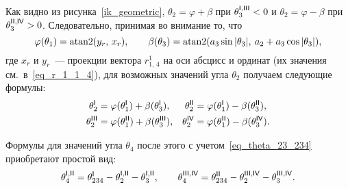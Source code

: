 Как видно из рисунка~\ref{ik_geometric}, $\theta_2 = \varphi + \beta$ при $\theta_3^{\mathsf{I,III}} < 0$ и $\theta_2 = \varphi - \beta$ при $\theta_3^{\mathsf{II,IV}} > 0$.
Следовательно, принимая во внимание то, что
\begin{equation}
    \varphi(\theta_1) = \atan2(y_r,\, x_r),
    \qquad
    \beta(\theta_3) = \atan2(a_3\sin|\theta_3|,\: a_2 + a_3\cos|\theta_3|),
\end{equation}
где $x_r$ и $y_r$~--- проекции вектора $r^1_{1,\,4}$ на оси абсцисс и ординат (их значения см.~в~\eqref{eq_r_1_1_4}), для возможных значений угла $\theta_2$ получаем следующие формулы:
\begin{align}
	\theta_2^{\mathsf{I}} &= \varphi(\theta_1^{\mathsf{I}}) + \beta(\theta_3^{\mathsf{I}}), &
	\theta_2^{\mathsf{II}} &= \varphi(\theta_1^{\mathsf{I}}) - \beta(\theta_3^{\mathsf{II}}),\\
	\theta_2^{\mathsf{III}} &= \varphi(\theta_1^{\mathsf{II}}) + \beta(\theta_3^{\mathsf{III}}), &
	\theta_2^{\mathsf{IV}} &= \varphi(\theta_1^{\mathsf{II}}) - \beta(\theta_3^{\mathsf{IV}})\ldotp
\end{align}

Формулы для значений угла $\theta_4$ после этого с учетом~\eqref{eq_theta_23_234} приобретают простой вид:
\begin{equation}
	\theta_4^{\mathsf{I,II}} = \theta_{234}^{\mathsf{I}} - \theta_{2}^{\mathsf{I,II}} - \theta_{3}^{\mathsf{I,II}},
	\qquad
	\theta_4^{\mathsf{III,IV}} = \theta_{234}^{\mathsf{II}} - \theta_{2}^{\mathsf{III, IV}} - \theta_{3}^{\mathsf{III,IV}}\ldotp
\end{equation}

